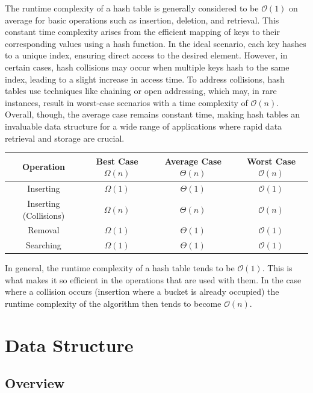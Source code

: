 \documentclass[a4paper,9pt]{article}
\begin{document}
The runtime complexity of a hash table is generally considered to be $\mathcal{O}(1)$ on average for basic operations such as insertion, deletion, and retrieval. This constant time complexity arises from 
the efficient mapping of keys to their corresponding values using a hash function. In the ideal scenario, each key hashes to a unique index, ensuring direct access to the desired element. However, in certain 
cases, hash collisions may occur when multiple keys hash to the same index, leading to a slight increase in access time. To address collisions, hash tables use techniques like chaining or open addressing, 
which may, in rare instances, result in worst-case scenarios with a time complexity of $\mathcal{O}(n)$. Overall, though, the average case remains constant time, making hash tables an invaluable data structure 
for a wide range of applications where rapid data retrieval and storage are crucial.

\begin{center}
    \begin{tabular}[ht]{|c|c|c|c|}
        \hline \textbf{Operation} & \textbf{Best Case } $\Omega(n)$ & \textbf{Average Case } $\Theta(n)$ & \textbf{Worst Case } $\mathcal{O}(n)$ \\ \hline
        Inserting & $\Omega(1)$ & $\Theta(1)$ & $\mathcal{O}(1)$ \\ \hline
        Inserting (Collisions) & $\Omega(n)$ & $\Theta(n)$ & $\mathcal{O}(n)$ \\ \hline
        Removal & $\Omega(1)$ & $\Theta(1)$ & $\mathcal{O}(1)$ \\ \hline
        Searching & $\Omega(1)$ & $\Theta(1)$ & $\mathcal{O}(1)$ \\ \hline
    \end{tabular}
\end{center}

\noindent In general, the runtime complexity of a hash table tends to be $\mathcal{O}(1)$. This is what makes it so efficient in the operations that are used with them. In the case where a collision occurs
(insertion where a bucket is already occupied) the runtime complexity of the algorithm then tends to become $\mathcal{O}(n)$.

\clearpage

\section*{Data Structure}

\subsection*{Overview}
\end{document}
